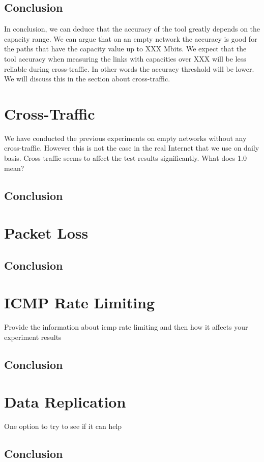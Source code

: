 \subsection*{Conclusion}
In conclusion, we can deduce that the accuracy of the tool greatly depends on the capacity range. We can argue that on an empty network the accuracy is good for the paths that have the capacity value up to XXX Mbits. We expect that the tool accuracy when measuring the links with capacities over XXX will be less reliable during cross-traffic. In other words the accuracy threshold will be lower. We will discuss this in the section about cross-traffic.

\section{Cross-Traffic}
We have conducted the previous experiments on empty networks without any cross-traffic. However this is not the case in the real Internet that we use on daily basis. 
Cross traffic seems to affect the test results significantly. 
What does 1.0 mean?

\subsection*{Conclusion}

\section{Packet Loss}

\subsection*{Conclusion}

\section{ICMP Rate Limiting}
Provide the information about icmp rate limiting and then how it affects your experiment results

\subsection*{Conclusion}


\section{Data Replication}
One option to try to see if it can help

\subsection*{Conclusion}
